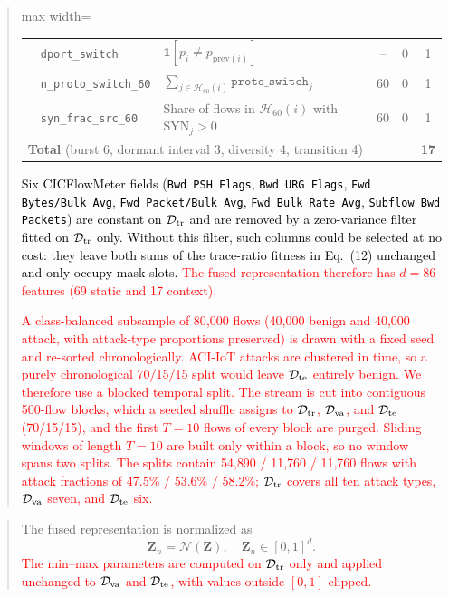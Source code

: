 \documentclass[11pt]{article}
\newenvironment{excerpt}{\begin{quote}\sloppy}{\end{quote}}
\begin{document}
\begin{excerpt}
\begin{table}[H]
\begin{adjustbox}{max width=\linewidth}
\begin{tabular}{l l >{\raggedright\arraybackslash}p{4.3cm} c c c}
 & \texttt{dport\_switch}       & $\mathbf{1}[p_i\neq p_{\mathrm{prev}(i)}]$ & -- & 0 & 1 \\
 & \texttt{n\_proto\_switch\_60} & $\sum_{j\in\mathcal{H}_{60}(i)} \texttt{proto\_switch}_j$ & 60 & 0 & 1 \\
 & \texttt{syn\_frac\_src\_60}  & Share of flows in $\mathcal{H}_{60}(i)$ with $\mathrm{SYN}_j>0$ & 60 & 0 & 1 \\
\midrule
\multicolumn{5}{l}{\textbf{Total} (burst 6, dormant interval 3, diversity 4, transition 4)} & \textbf{17} \\
\hline\toprule
\end{tabular}
\end{adjustbox}
\end{table}

\textcolor{black}{Six CICFlowMeter fields (\texttt{Bwd PSH Flags},
\texttt{Bwd URG Flags}, \texttt{Fwd Bytes/Bulk Avg},
\texttt{Fwd Packet/Bulk Avg}, \texttt{Fwd Bulk Rate Avg},
\texttt{Subflow Bwd Packets}) are constant on $\mathcal{D}_{\rm tr}$
and are removed by a zero-variance filter fitted on
$\mathcal{D}_{\rm tr}$ only. Without this filter, such columns could
be selected at no cost: they leave both sums of the trace-ratio
fitness in Eq.~(12) unchanged and only occupy mask slots.}
\textcolor{red}{The fused representation therefore has
$d=86$ features (69 static and 17 context).}

\textcolor{red}{A class-balanced subsample of 80{,}000
flows (40{,}000 benign and 40{,}000 attack, with attack-type
proportions preserved) is drawn with a fixed seed and re-sorted
chronologically. ACI-IoT attacks are clustered in time, so a purely
chronological 70/15/15 split would leave $\mathcal{D}_{\rm te}$
entirely benign. We therefore use a blocked temporal split. The
stream is cut into contiguous 500-flow blocks, which a seeded shuffle
assigns to $\mathcal{D}_{\rm tr}$, $\mathcal{D}_{\rm va}$, and
$\mathcal{D}_{\rm te}$ (70/15/15), and the first $T=10$ flows of
every block are purged. Sliding windows of length $T=10$ are built
only within a block, so no window spans two splits. The splits
contain 54{,}890 / 11{,}760 / 11{,}760 flows with attack fractions
of 47.5\% / 53.6\% / 58.2\%; $\mathcal{D}_{\rm tr}$ covers all ten
attack types, $\mathcal{D}_{\rm va}$ seven, and $\mathcal{D}_{\rm te}$
six.}
\end{excerpt}
\begin{excerpt}
The fused representation is normalized as
\begin{equation}
\mathbf{Z}_n = \mathcal{N}(\mathbf{Z}),\quad
\mathbf{Z}_n \in [0,1]^d.
\tag{5}
\end{equation}
\textcolor{red}{The min--max parameters are computed on
$\mathcal{D}_{\rm tr}$ only and applied unchanged to
$\mathcal{D}_{\rm va}$ and $\mathcal{D}_{\rm te}$, with values
outside $[0,1]$ clipped.}
\end{excerpt}
\end{document}
